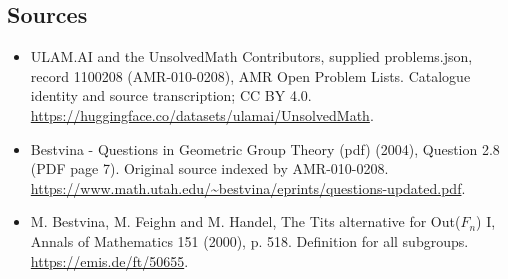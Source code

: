 \documentclass[11pt,a4paper]{article}
\begin{document}
\subsection{Sources}
\begin{itemize}
\item[S1] ULAM.AI and the UnsolvedMath Contributors, supplied problems.json, record 1100208 (AMR-010-0208), AMR Open Problem Lists. Catalogue identity and source transcription; CC BY 4.0.
\url{https://huggingface.co/datasets/ulamai/UnsolvedMath}.
\item[S2] Bestvina - Questions in Geometric Group Theory (pdf) (2004), Question 2.8 (PDF page 7). Original source indexed by AMR-010-0208.
\url{https://www.math.utah.edu/~bestvina/eprints/questions-updated.pdf}.
\item[S3] M. Bestvina, M. Feighn and M. Handel, The Tits alternative for Out($F_n$) I, Annals of Mathematics 151 (2000), p. 518. Definition for all subgroups.
\url{https://emis.de/ft/50655}.
\end{itemize}
\end{document}
